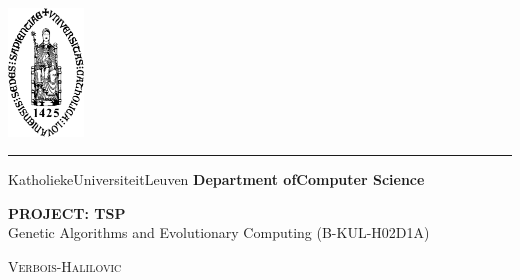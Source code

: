 \documentclass{report}
\begin{document}
\begin{titlepage}
	\newpage
	\thispagestyle{empty}
	\frenchspacing
	\hspace{-0.2cm}
	\includegraphics[height=3.4cm]{sedes}
	\hspace{0.2cm}
	\rule{0.5pt}{3.4cm}
	\hspace{0.2cm}
	\begin{minipage}[b]{8cm}
		\Large{Katholieke\newline Universiteit\newline Leuven}\smallskip\newline
		\large{}\smallskip\newline
		\textbf{Department of\newline Computer Science}\smallskip
	\end{minipage}
	\vspace*{3.2cm}\vfill
	\begin{center}
		\begin{minipage}[t]{\textwidth}
			\begin{center}
				\LARGE{\rm{\textbf{\uppercase{Project: TSP}}}}\\
				\Large{\rm{Genetic Algorithms and Evolutionary Computing (B-KUL-H02D1A) }}\\
				\vspace{0.5cm}

			    \large{\textsc{Verbois-Halilovic}}%

			\end{center}
		\end{minipage}
	\end{center}
	\vfill
	\hfill{}
\end{titlepage}

\newpage
\tableofcontents
\newpage
\end{document}
